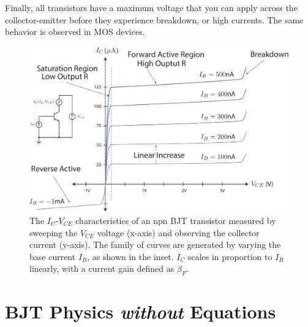Finally, all transistors have a maximum voltage that you can apply across the collector-emitter before they experience breakdown, or high currents.  The same behavior is observed in MOS devices.  
\begin{figure}[tb]
\begin{center}
\includegraphics[width=.75\columnwidth]{slide7_bjt_ic_vs_ib_curves}
\end{center}
\caption{The $I_C$-$V_{CE}$ characteristics of an npn BJT transistor measured by sweeping the $V_{CE}$ voltage (x-axis) and observing the collector current (y-axis).  The family of curves are generated by varying the base current $I_B$, as shown in the inset.  $I_C$ scales in proportion to $I_B$ linearly, with a current gain defined as $\beta_F$.}
\label{fig:slide7_bjt_ic_vs_ib_curves}
\end{figure}
\section{BJT Physics \emph{without} Equations}
